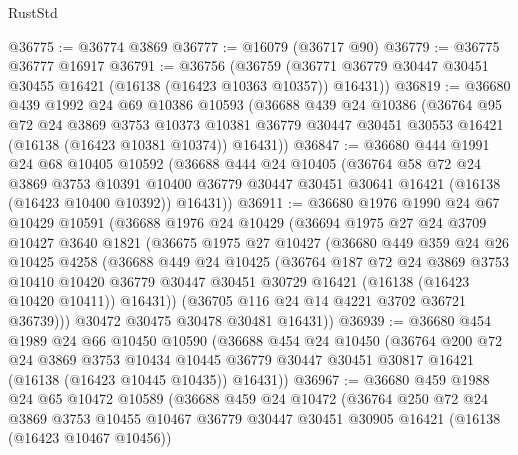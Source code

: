 \begin{lexlean}{RustStd}
\begin{coremodule}
@36775 := @36774 @3869
@36777 := @16079 (@36717 @90)
@36779 := @36775 @36777 @16917
@36791 := @36756
    (@36759 (@36771 @36779 @30447 @30451 @30455 @16421 (@16138 (@16423 @10363 @10357)) @16431))
@36819 := @36680
    @439
    @1992
    @24
    @69
    @10386
    @10593
    (@36688
      @439
      @24
      @10386
      (@36764
        @95
        @72
        @24
        @3869
        @3753
        @10373
        @10381
        @36779
        @30447
        @30451
        @30553
        @16421
        (@16138 (@16423 @10381 @10374))
        @16431))
@36847 := @36680
    @444
    @1991
    @24
    @68
    @10405
    @10592
    (@36688
      @444
      @24
      @10405
      (@36764
        @58
        @72
        @24
        @3869
        @3753
        @10391
        @10400
        @36779
        @30447
        @30451
        @30641
        @16421
        (@16138 (@16423 @10400 @10392))
        @16431))
@36911 := @36680
    @1976
    @1990
    @24
    @67
    @10429
    @10591
    (@36688
      @1976
      @24
      @10429
      (@36694
        @1975
        @27
        @24
        @3709
        @10427
        @3640
        @1821
        (@36675
          @1975
          @27
          @10427
          (@36680
            @449
            @359
            @24
            @26
            @10425
            @4258
            (@36688
              @449
              @24
              @10425
              (@36764
                @187
                @72
                @24
                @3869
                @3753
                @10410
                @10420
                @36779
                @30447
                @30451
                @30729
                @16421
                (@16138 (@16423 @10420 @10411))
                @16431))
            (@36705 @116 @24 @14 @4221 @3702 @36721 @36739)))
        @30472
        @30475
        @30478
        @30481
        @16431))
@36939 := @36680
    @454
    @1989
    @24
    @66
    @10450
    @10590
    (@36688
      @454
      @24
      @10450
      (@36764
        @200
        @72
        @24
        @3869
        @3753
        @10434
        @10445
        @36779
        @30447
        @30451
        @30817
        @16421
        (@16138 (@16423 @10445 @10435))
        @16431))
@36967 := @36680
    @459
    @1988
    @24
    @65
    @10472
    @10589
    (@36688
      @459
      @24
      @10472
      (@36764
        @250
        @72
        @24
        @3869
        @3753
        @10455
        @10467
        @36779
        @30447
        @30451
        @30905
        @16421
        (@16138 (@16423 @10467 @10456))

\end{coremodule}
\end{lexlean}
